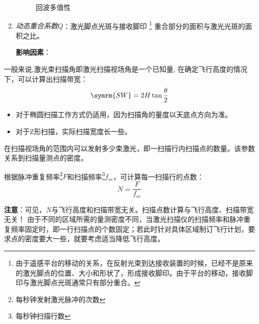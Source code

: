 \begin{enumerate}
\begin{figure}[htbp]
			\caption{回波多值性}
			\label{fig:回波多值性}
		\end{figure}
	\item \textit{动态重合系数$ Q $}：激光脚点光斑与接收脚印
		\footnote{由于遥感平台的移动的关系，在反射光束到达接收装置的时候，已经不是原来的激光脚点的位置、大小和形状了，形成接收脚印。由于平台的移动，接收脚印与激光脚点光斑通常只有部分重合。}
		重合部分的面积与激光光斑的面积之比。
		
		\textbf{影响因素}：
\end{enumerate} %

一般来说,激光束扫描角即激光扫描视场角是一个已知量, 在确定飞行高度的情况下，可以计算出扫描带宽：
\begin{equation}
\symrm{SW} = 2H \tan \dfrac{\theta}{2}
\end{equation}
\begin{itemize}
	\item 对于椭圆扫描工作方式仍适用，因为扫描角的量度以天底点方向为准。
	\item 对于Z形扫描，实际扫描宽度长一些。
\end{itemize}

在扫描视场角的范围内可以发射多少束激光，即一扫描行内扫描点的数量。该参数关系到扫描量测点的密度。

根据脉冲重复频率\footnote{每秒钟发射激光脉冲的次数}$ F $和扫描频率\footnote{每秒钟扫描行数}$ f_{sc} $，可计算每一扫描行的点数：
\begin{equation}
N = \dfrac{F}{f_{sc}}
\end{equation}

\textbf{注意}：可见，$ N $与飞行高度和扫描带宽无关。扫描点数计算与飞行高度、扫描带宽无关！
由于不同的区域所需的量测密度不同，当激光扫描仪的扫描频率和脉冲重复频率固定时，即一行扫描点的个数固定；若此时针对具体区域制订飞行计划，要求点的密度要大一些，就要考虑适当降低飞行高度。

